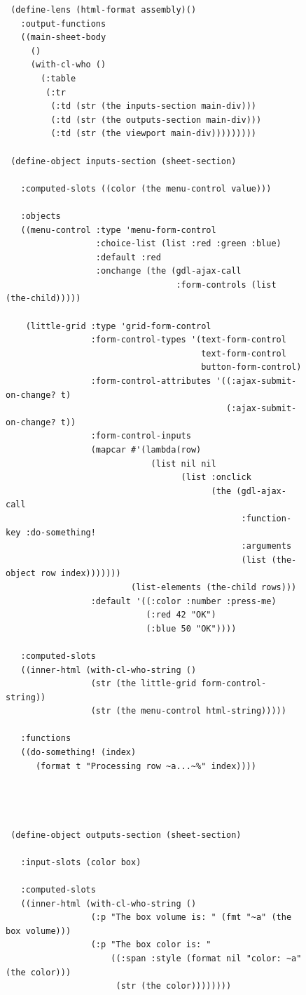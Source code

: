 \documentclass [11pt]{book}
\begin{document}
\begin{itemize}
\begin{figure}
\begin{lrbox}{\boxedverb}
\begin{minipage}{\linewidth}
{\begin{verbatim}
 (define-lens (html-format assembly)()
   :output-functions
   ((main-sheet-body
     ()
     (with-cl-who ()
       (:table 
        (:tr
         (:td (str (the inputs-section main-div)))
         (:td (str (the outputs-section main-div)))
         (:td (str (the viewport main-div)))))))))

 (define-object inputs-section (sheet-section)

   :computed-slots ((color (the menu-control value)))
  
   :objects
   ((menu-control :type 'menu-form-control
                  :choice-list (list :red :green :blue)
                  :default :red
                  :onchange (the (gdl-ajax-call 
                                  :form-controls (list (the-child)))))
   
    (little-grid :type 'grid-form-control
                 :form-control-types '(text-form-control 
                                       text-form-control 
                                       button-form-control)
                 :form-control-attributes '((:ajax-submit-on-change? t)
                                            (:ajax-submit-on-change? t))
                 :form-control-inputs 
                 (mapcar #'(lambda(row)
                             (list nil nil 
                                   (list :onclick 
                                         (the (gdl-ajax-call 
                                               :function-key :do-something!
                                               :arguments 
                                               (list (the-object row index)))))))
                         (list-elements (the-child rows)))
                 :default '((:color :number :press-me)
                            (:red 42 "OK")
                            (:blue 50 "OK"))))
   
   :computed-slots 
   ((inner-html (with-cl-who-string ()
                 (str (the little-grid form-control-string))
                 (str (the menu-control html-string)))))
   
   :functions
   ((do-something! (index)
      (format t "Processing row ~a...~%" index))))




 (define-object outputs-section (sheet-section)
   
   :input-slots (color box)
  
   :computed-slots 
   ((inner-html (with-cl-who-string ()
                 (:p "The box volume is: " (fmt "~a" (the box volume)))
                 (:p "The box color is: " 
                     ((:span :style (format nil "color: ~a" (the color)))
                      (str (the color))))))))




\end{verbatim}}
\end{minipage}
\end{lrbox}
\end{figure}
\end{itemize}
\end{document}
